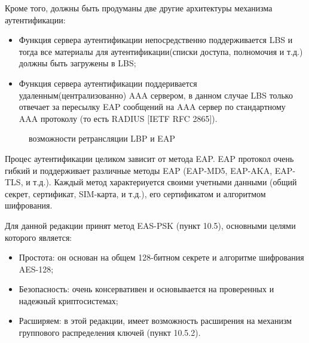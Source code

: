 Кроме того, должны быть продуманы две другие архитектуры механизма аутентификации:
\begin{itemize}
 \item Функция сервера аутентификации непосредственно поддерживается LBS и тогда все материалы для аутентификации(списки доступа, полномочия и т.д.) должны быть загружены в LBS;
 \item Функция сервера аутентификации поддеривается удаленным(централизованно) AAA сервером, в данном случае LBS только отвечает за пересылку EAP сообщений на AAA сервер по стандартному AAA протоколу (то есть RADIUS [IETF RFC 2865]).
\end{itemize}
\begin{figure}[h]
\caption{возможности ретрансляции LBP и EAP}
\label{img:10-1}
\end{figure}

Процес аутентификации целиком зависит от метода EAP. EAP протокол очень гибкий и поддерживает различные методы EAP (EAP-MD5, EAP-AKA, EAP-TLS, и т.д.). Каждый метод характериуется своими учетными данными (общий секрет, сертификат, SIM-карта, и т.д.), его сертификатом и алгоритмом шифрования.

Для данной редакции принят метод EAS-PSK (пункт 10.5), основными целями которого является:
\begin{itemize}
 \item Простота: он основан на общем 128-битном секрете и алгоритме шифрования AES-128;
 \item Безопасность: очень консервативен и основывается на проверенных и надежный криптосистемах;
 \item Расширяем: в этой редакции, имеет возможность расширения на механизм группового распределения ключей (пункт 10.5.2).
\end{itemize}


